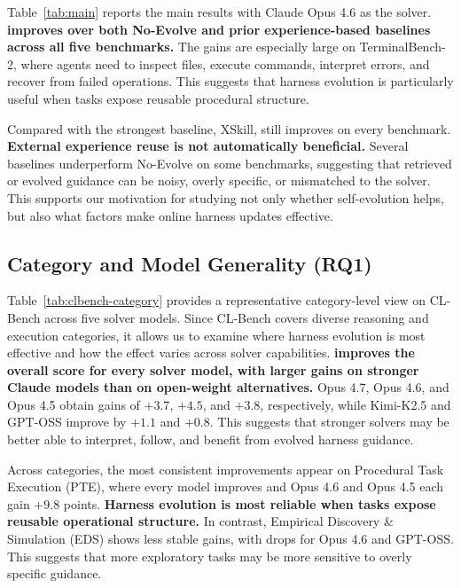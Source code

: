 Table~\ref{tab:main} reports the main results with Claude Opus 4.6 as the solver. 
\textbf{\algname{} improves over both No-Evolve and prior experience-based baselines across all five benchmarks.}
The gains are especially large on TerminalBench-2, where agents need to inspect files, execute commands, interpret errors, and recover from failed operations. This suggests that harness evolution is particularly useful when tasks expose reusable procedural structure.

Compared with the strongest baseline, XSkill, \algname{} still improves on every benchmark. 
\textbf{External experience reuse is not automatically beneficial.}
Several baselines underperform No-Evolve on some benchmarks, suggesting that retrieved or evolved guidance can be noisy, overly specific, or mismatched to the solver. This supports our motivation for studying not only whether self-evolution helps, but also what factors make online harness updates effective.

\subsection{Category and Model Generality (RQ1)}
\label{sec:exp-category-model}

Table~\ref{tab:clbench-category} provides a representative category-level view on CL-Bench across five solver models. Since CL-Bench covers diverse reasoning and execution categories, it allows us to examine where harness evolution is most effective and how the effect varies across solver capabilities.
\textbf{\algname{} improves the overall score for every solver model, with larger gains on stronger Claude models than on open-weight alternatives.}
Opus 4.7, Opus 4.6, and Opus 4.5 obtain gains of $+3.7$, $+4.5$, and $+3.8$, respectively, while Kimi-K2.5 and GPT-OSS improve by $+1.1$ and $+0.8$. This suggests that stronger solvers may be better able to interpret, follow, and benefit from evolved harness guidance.

Across categories, the most consistent improvements appear on Procedural Task Execution (PTE), where every model improves and Opus 4.6 and Opus 4.5 each gain $+9.8$ points. 
\textbf{Harness evolution is most reliable when tasks expose reusable operational structure.}
In contrast, Empirical Discovery \& Simulation (EDS) shows less stable gains, with drops for Opus 4.6 and GPT-OSS. This suggests that more exploratory tasks may be more sensitive to overly specific guidance.






